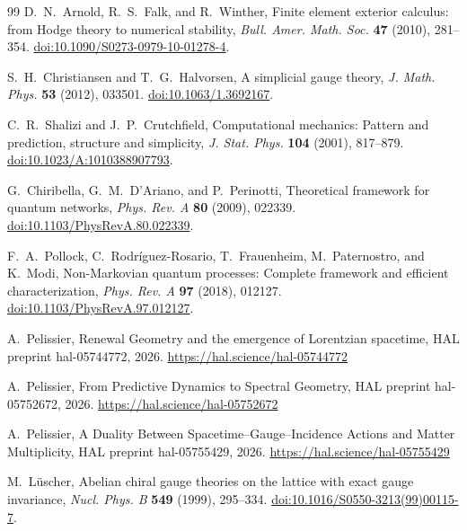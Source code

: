 \documentclass[11pt]{article}
\numberwithin{equation}{section}
\theoremstyle{definition}
\theoremstyle{remark}
\begin{document}
\begin{thebibliography}{99}
D.~N.~Arnold, R.~S.~Falk, and R.~Winther,
Finite element exterior calculus: from Hodge theory to numerical stability,
\emph{Bull. Amer. Math. Soc.} \textbf{47} (2010), 281--354.
\href{https://doi.org/10.1090/S0273-0979-10-01278-4}{doi:10.1090/S0273-0979-10-01278-4}.

S.~H.~Christiansen and T.~G.~Halvorsen,
A simplicial gauge theory,
\emph{J. Math. Phys.} \textbf{53} (2012), 033501.
\href{https://doi.org/10.1063/1.3692167}{doi:10.1063/1.3692167}.

C.~R.~Shalizi and J.~P.~Crutchfield,
Computational mechanics: Pattern and prediction, structure and simplicity,
\emph{J. Stat. Phys.} \textbf{104} (2001), 817--879.
\href{https://doi.org/10.1023/A:1010388907793}{doi:10.1023/A:1010388907793}.

G.~Chiribella, G.~M.~D'Ariano, and P.~Perinotti,
Theoretical framework for quantum networks,
\emph{Phys. Rev. A} \textbf{80} (2009), 022339.
\href{https://doi.org/10.1103/PhysRevA.80.022339}{doi:10.1103/PhysRevA.80.022339}.

F.~A.~Pollock, C.~Rodr\'iguez-Rosario, T.~Frauenheim,
M.~Paternostro, and K.~Modi,
Non-Markovian quantum processes: Complete framework and efficient characterization,
\emph{Phys. Rev. A} \textbf{97} (2018), 012127.
\href{https://doi.org/10.1103/PhysRevA.97.012127}{doi:10.1103/PhysRevA.97.012127}.

A.~Pelissier,
\newblock Renewal Geometry and the emergence of Lorentzian spacetime,
\newblock HAL preprint hal-05744772, 2026.
\newblock \url{https://hal.science/hal-05744772}

A.~Pelissier,
\newblock From Predictive Dynamics to Spectral Geometry,
\newblock HAL preprint hal-05752672, 2026.
\newblock \url{https://hal.science/hal-05752672}

A.~Pelissier,
\newblock A Duality Between Spacetime--Gauge--Incidence Actions and Matter Multiplicity,
\newblock HAL preprint hal-05755429, 2026.
\newblock \url{https://hal.science/hal-05755429}

M.~L\"uscher,
Abelian chiral gauge theories on the lattice with exact gauge invariance,
\emph{Nucl. Phys. B} \textbf{549} (1999), 295--334.
\href{https://doi.org/10.1016/S0550-3213(99)00115-7}{doi:10.1016/S0550-3213(99)00115-7}.


\end{thebibliography}
\end{document}

